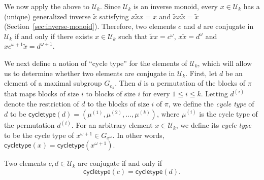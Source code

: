\documentclass[ALCO,Unicode]{cedram}
\newcommand{\defncolor}{\color{darkred}}
\newcommand{\defn}[1]{{\defncolor\emph{#1}}} %
\begin{document}
We now apply the above to $\mathcal{U}_k$.
Since $\mathcal{U}_k$ is an inverse monoid, every
$x\in \mathcal{U}_k$ has a (unique) generalized inverse $\widetilde{x}$
satisfying $x\widetilde{x}x = x$ and $\widetilde{x}x\widetilde{x}
= \widetilde{x}$ (\cf Section~\ref{sec:inverse-monoid}).
Therefore, two elements $c$ and $d$ are conjugate in $\mathcal{U}_k$ if and only if there
exists $x \in \mathcal{U}_k$ such that
$\widetilde{x}x = c^{\omega}$,
$x \widetilde{x} = d^{\omega}$
and $x c^{\omega +1} \widetilde{x} = d^{\omega + 1}$.

We next define a notion of ``cycle type'' for the elements of $\mathcal{U}_k$,
which will allow us to determine whether two elements are conjugate in $\mathcal{U}_k$.
First, let $d$ be an element of a maximal subgroup $G_{e_\pi}$.
Then $d$ is a permutation of the blocks of $\pi$ that maps blocks of size $i$
to blocks of size $i$ for every $1 \leqslant i \leqslant k$.
Letting $d^{(i)}$ denote the restriction of $d$ to the blocks of size $i$ of $\pi$,
we define the \defn{cycle type} of $d$ to be $\mathsf{cycletype}(d) = (\mu^{(1)}, \mu^{(2)}, \ldots, \mu^{(k)})$,
where $\mu^{(i)}$ is the cycle type of the permutation $d^{(i)}$.
For an arbitrary element $x \in \mathcal{U}_k$, we define its
\defn{cycle type} to be the cycle type of $x^{\omega +1} \in G_{x^\omega}$.
In other words, $\mathsf{cycletype}(x) = \mathsf{cycletype}(x^{\omega + 1})$.

\begin{prop}\label{prop:conjugacyclasses}
    Two elements $c, d \in \mathcal{U}_k$ are conjugate if and only if
    \[
        \mathsf{cycletype}(c) = \mathsf{cycletype}(d).
    \]
\end{prop}
\end{document}
